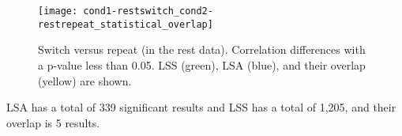 \documentclass[10pt,letterpaper]{article}
\newlength\savedwidth
\newcommand\thickhline{\noalign{\global\savedwidth\arrayrulewidth\global\arrayrulewidth 2pt}%
\hline
\noalign{\global\arrayrulewidth\savedwidth}}
\begin{document}
\begin{figure}[H]
  \centering
  \texttt{[image: cond1-restswitch\_cond2-restrepeat\_statistical\_overlap]}
  \caption{
    Switch versus repeat (in the rest data). Correlation differences with a p-value less than 0.05.
    LSS (green), LSA (blue), and their overlap (yellow) are shown.
  }
  \label{fig:restswitchvrepeat}
\end{figure}
LSA has a total of 339 significant results and LSS has a total of 1,205,
and their overlap is 5 results.
\end{document}
